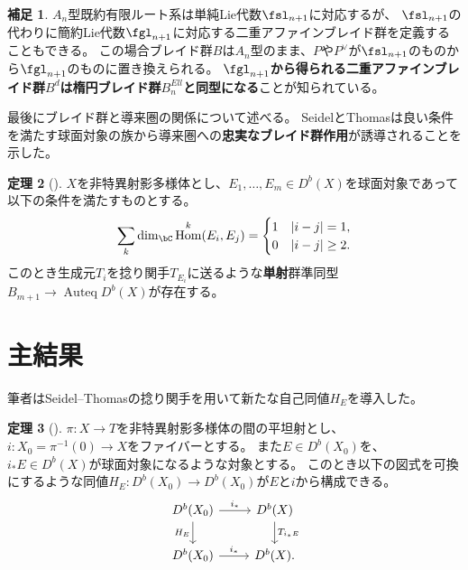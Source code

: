 \documentclass[uplatex,11pt,a4paper,dvipdfmx]{jsarticle}
\numberwithin{equation}{section}
\numberwithin{figure}{section}
\theoremstyle{definition}
\newtheorem{theorem}{定理}[section]
\newtheorem{remark}[theorem]{補足}
\DeclareMathOperator{\Hom}{\mathrm{Hom}}
\DeclareMathOperator{\Auteq}{\mathrm{Auteq}}
\begin{document}
\begin{remark}\label{remark:gl-braid-group}
    $A_n$型既約有限ルート系は単純Lie代数$\fsl_{n+1}$に対応するが、
    $\fsl_{n+1}$の代わりに簡約Lie代数$\fgl_{n+1}$に対応する二重アファインブレイド群を定義することもできる。
    この場合ブレイド群$B$は$A_n$型のまま、$P$や$P^\vee$が$\fsl_{n+1}$のものから$\fgl_{n+1}$のものに置き換えられる。
    \textbf{$\fgl_{n+1}$から得られる二重アファインブレイド群$B^d$は楕円ブレイド群$B^{Ell}_n$と同型になる}ことが知られている。
\end{remark}


最後にブレイド群と導来圏の関係について述べる。
SeidelとThomasは良い条件を満たす球面対象の族から導来圏への\textbf{忠実なブレイド群作用}が誘導されることを示した\cite{MR1831820}。
\begin{theorem}[\cite{MR1831820}]
    $X$を非特異射影多様体とし、$E_1, \dots, E_m \in D^b(X)$を球面対象であって以下の条件を満たすものとする。
    \begin{equation}
        \sum_k\dim_\bC\Hom^k(E_i, E_j) = \begin{cases}
            1 & |i-j| = 1,    \\
            0 & |i-j| \geq 2.
        \end{cases}
    \end{equation}
    このとき生成元$T_i$を捻り関手$T_{E_i}$に送るような\textbf{単射}群準同型$B_{m+1} \to \Auteq D^b(X)$が存在する。
\end{theorem}




\section{主結果}
筆者はSeidel--Thomasの捻り関手を用いて新たな自己同値$H_E$を導入した。
\begin{theorem}[\cite{2023arXiv230212501A}]
    $\pi \colon X \to T$を非特異射影多様体の間の平坦射とし、$i \colon X_0 = \pi^{-1}(0) \to X$をファイバーとする。
    また$E \in D^b(X_0)$を、$i_*E \in D^b(X)$が球面対象になるような対象とする。
    このとき以下の図式を可換にするような同値$H_E \colon D^b(X_0) \to D^b(X_0)$が$E$と$i$から構成できる。
    \begin{equation}
        \begin{tikzcd}
            D^b(X_0) \arrow[r,"i_*"]\arrow[d, "H_E"'] & D^b(X) \arrow[d,"T_{i_*E}"]\\
            D^b(X_0) \arrow[r, "i_*"]& D^b(X).
        \end{tikzcd}
    \end{equation}
\end{theorem}
\end{document}
